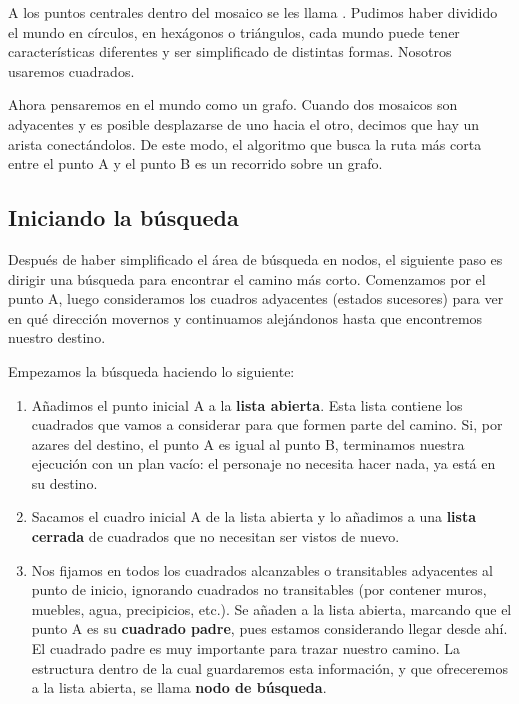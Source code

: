 A los puntos centrales dentro del mosaico se les llama . Pudimos haber dividido el mundo en círculos, en hexágonos o triángulos, cada mundo puede tener características diferentes y ser simplificado de distintas formas.  Nosotros usaremos cuadrados.

Ahora pensaremos en el mundo como un grafo.  Cuando dos mosaicos son adyacentes y es posible desplazarse de uno hacia el otro, decimos que hay un arista conectándolos.  De este modo, el algoritmo que busca la ruta más corta entre el punto A y el punto B es un recorrido sobre un grafo.

\subsection{Iniciando la b\'usqueda}

Después de haber simplificado el área de búsqueda en nodos, el siguiente paso es dirigir una búsqueda para encontrar el camino más corto.  Comenzamos por el punto A, luego consideramos los cuadros adyacentes (estados sucesores) para ver en qué dirección movernos y continuamos alejándonos hasta que encontremos nuestro destino.

\noindent Empezamos la búsqueda haciendo lo siguiente:

\begin{enumerate}
  \item Añadimos el punto inicial A a la \textbf{lista abierta}. Esta lista contiene los cuadrados que vamos a considerar para que formen parte del camino. Si, por azares del destino, el punto A es igual al punto B, terminamos nuestra ejecución con un plan vacío: el personaje no necesita hacer nada, ya está en su destino.
  
  \item Sacamos el cuadro inicial A de la lista abierta y lo añadimos a una \textbf{lista cerrada} de cuadrados que no necesitan ser vistos de nuevo.
  
  \item Nos fijamos en todos los cuadrados alcanzables o transitables adyacentes al punto de inicio, ignorando cuadrados no transitables (por contener muros, muebles, agua, precipicios, etc.). Se añaden a la lista abierta, marcando que el punto A es su \textbf{cuadrado padre}, pues estamos considerando llegar desde ahí. El cuadrado padre es muy importante para trazar nuestro camino.  La estructura dentro de la cual guardaremos esta información, y que ofreceremos a la lista abierta, se llama \textbf{nodo de búsqueda}.
\end{enumerate}

